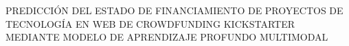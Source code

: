 \begin{center}
	\vspace*{10cm}
	{PREDICCIÓN DEL ESTADO DE FINANCIAMIENTO DE PROYECTOS DE TECNOLOGÍA EN WEB DE CROWDFUNDING KICKSTARTER MEDIANTE MODELO DE APRENDIZAJE PROFUNDO MULTIMODAL}
\end{center}
